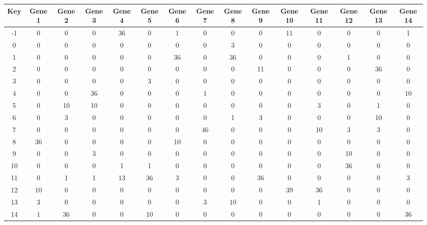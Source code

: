 \begin{tabular}{|c|c|c|c|c|c|c|c|c|c|c|c|c|c|c|}
\hline
Key & Gene 1 & Gene 2 & Gene 3 & Gene 4 & Gene 5 & Gene 6 & Gene 7 & Gene 8 & Gene 9 & Gene 10 & Gene 11 & Gene 12 & Gene 13 & Gene 14 \\
\hline
-1 & 0 & 0 & 0 & 36 & 0 & 1 & 0 & 0 & 0 & 11 & 0 & 0 & 0 & 1 \\
0 & 0 & 0 & 0 & 0 & 0 & 0 & 0 & 3 & 0 & 0 & 0 & 0 & 0 & 0 \\
1 & 0 & 0 & 0 & 0 & 0 & 36 & 0 & 36 & 0 & 0 & 0 & 1 & 0 & 0 \\
2 & 0 & 0 & 0 & 0 & 0 & 0 & 0 & 0 & 11 & 0 & 0 & 0 & 36 & 0 \\
3 & 0 & 0 & 0 & 0 & 3 & 0 & 0 & 0 & 0 & 0 & 0 & 0 & 0 & 0 \\
4 & 0 & 0 & 36 & 0 & 0 & 0 & 1 & 0 & 0 & 0 & 0 & 0 & 0 & 10 \\
5 & 0 & 10 & 10 & 0 & 0 & 0 & 0 & 0 & 0 & 0 & 3 & 0 & 1 & 0 \\
6 & 0 & 3 & 0 & 0 & 0 & 0 & 0 & 1 & 3 & 0 & 0 & 0 & 10 & 0 \\
7 & 0 & 0 & 0 & 0 & 0 & 0 & 46 & 0 & 0 & 0 & 10 & 3 & 3 & 0 \\
8 & 36 & 0 & 0 & 0 & 0 & 10 & 0 & 0 & 0 & 0 & 0 & 0 & 0 & 0 \\
9 & 0 & 0 & 3 & 0 & 0 & 0 & 0 & 0 & 0 & 0 & 0 & 10 & 0 & 0 \\
10 & 0 & 0 & 0 & 1 & 1 & 0 & 0 & 0 & 0 & 0 & 0 & 36 & 0 & 0 \\
11 & 0 & 1 & 1 & 13 & 36 & 3 & 0 & 0 & 36 & 0 & 0 & 0 & 0 & 3 \\
12 & 10 & 0 & 0 & 0 & 0 & 0 & 0 & 0 & 0 & 39 & 36 & 0 & 0 & 0 \\
13 & 3 & 0 & 0 & 0 & 0 & 0 & 3 & 10 & 0 & 0 & 1 & 0 & 0 & 0 \\
14 & 1 & 36 & 0 & 0 & 10 & 0 & 0 & 0 & 0 & 0 & 0 & 0 & 0 & 36 \\
\hline
\end{tabular}